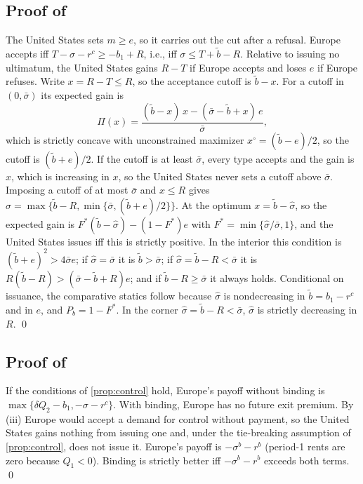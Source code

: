 \subsection*{Proof of }

The United States sets $m\geq e$, so it carries out the cut after a refusal. Europe accepts iff $T - \sigma - r^c \geq -b_1 + R$, i.e., iff $\sigma \leq T + \tilde b - R$. Relative to issuing no ultimatum, the United States gains $R - T$ if Europe accepts and loses $e$ if Europe refuses. Write $x = R - T \leq R$, so the acceptance cutoff is $\tilde b - x$. For a cutoff in $(0,\bar\sigma)$ its expected gain is
\begin{equation*}
\Pi(x) = \frac{(\tilde b-x)\,x - (\bar\sigma - \tilde b + x)\,e}{\bar\sigma},
\end{equation*}
which is strictly concave with unconstrained maximizer $x^\circ = (\tilde b-e)/2$, so the cutoff is $(\tilde b+e)/2$. If the cutoff is at least $\bar\sigma$, every type accepts and the gain is $x$, which is increasing in $x$, so the United States never sets a cutoff above $\bar\sigma$. Imposing a cutoff of at most $\bar\sigma$ and $x\leq R$ gives $\hat\sigma = \max\{\tilde b-R, \min\{\bar\sigma, (\tilde b+e)/2\}\}$. At the optimum $x = \tilde b - \hat\sigma$, so the expected gain is $F^*(\tilde b - \hat\sigma) - (1-F^*)e$ with $F^*=\min\{\hat\sigma/\bar\sigma,1\}$, and the United States issues iff this is strictly positive. In the interior this condition is $(\tilde b+e)^2 > 4\bar\sigma e$; if $\hat\sigma=\bar\sigma$ it is $\tilde b>\bar\sigma$; if $\hat\sigma = \tilde b-R<\bar\sigma$ it is $R(\tilde b-R)>(\bar\sigma-\tilde b+R)e$; and if $\tilde b-R\geq\bar\sigma$ it always holds. Conditional on issuance, the comparative statics follow because $\hat\sigma$ is nondecreasing in $\tilde b = b_1 - r^c$ and in $e$, and $P_b = 1 - F^*$. In the corner $\hat\sigma = \tilde b-R < \bar\sigma$, $\hat\sigma$ is strictly decreasing in $R$. \qed

\subsection*{Proof of }

If the conditions of \cref{prop:control} hold, Europe's payoff without binding is $\max\{\delta Q_2 - b_1, -\sigma - r^c\}$. With binding, Europe has no future exit premium. By (iii) Europe would accept a demand for control without payment, so the United States gains nothing from issuing one and, under the tie-breaking assumption of \cref{prop:control}, does not issue it. Europe's payoff is $-\sigma^b - r^b$ (period-1 rents are zero because $Q_1<0$). Binding is strictly better iff $-\sigma^b - r^b$ exceeds both terms. \qed

